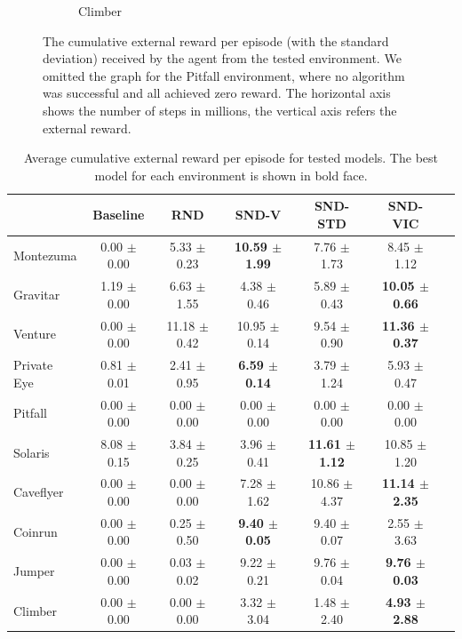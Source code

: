 \documentclass[a4paper,11pt]{elsarticle}
\begin{document}
\begin{figure}[t!]
\begin{subfigure}[b]{0.32\textwidth}
    \caption{Climber}
    \label{fig:res2j}
  \end{subfigure}
\caption{The cumulative external reward per episode (with the standard deviation) received by the agent from the tested environment. We omitted the graph for the Pitfall environment, where no algorithm was successful and all achieved zero reward. The horizontal axis shows the number of steps in millions, the vertical axis refers the external reward.}
\label{fig:result}
\end{figure}

\begin{table}[thb]
\scriptsize
\centering
\caption{Average cumulative external reward per episode for tested models. The best model for each environment is shown in bold face.}
\begin{tabular}{l|cccccc}
\hline
 & Baseline & RND & SND-V & SND-STD & SND-VIC \\
\hline\hline
Montezuma & 0.00 $\pm$ 0.00 & 5.33 $\pm$ 0.23 & \textbf{10.59 $\pm$ 1.99} & 7.76 $\pm$ 1.73 & 8.45 $\pm$ 1.12 \\
Gravitar & 1.19 $\pm$ 0.00 & 6.63 $\pm$ 1.55 & 4.38 $\pm$ 0.46 & 5.89 $\pm$ 0.43 &\textbf{ 10.05 $\pm$ 0.66} \\
Venture & 0.00 $\pm$ 0.00 & 11.18 $\pm$ 0.42 & 10.95 $\pm$ 0.14 & 9.54 $\pm$ 0.90 & \textbf{11.36 $\pm$ 0.37} \\ 
Private Eye & 0.81 $\pm$ 0.01 & 2.41 $\pm$ 0.95 & \textbf{6.59 $\pm$ 0.14} & 3.79 $\pm$ 1.24 & 5.93 $\pm$ 0.47  \\ 
Pitfall & 0.00 $\pm$ 0.00 & 0.00 $\pm$ 0.00 & 0.00 $\pm$ 0.00 & 0.00 $\pm$ 0.00 & 0.00 $\pm$ 0.00 \\ 
Solaris & 8.08 $\pm$ 0.15 & 3.84 $\pm$ 0.25 & 3.96 $\pm$ 0.41 & \textbf{11.61 $\pm$ 1.12} & 10.85 $\pm$ 1.20  \\
Caveflyer & 0.00 $\pm$ 0.00 & 0.00 $\pm$ 0.00 & 7.28 $\pm$ 1.62 & 10.86 $\pm$ 4.37 & \textbf{11.14 $\pm$ 2.35} \\
Coinrun & 0.00 $\pm$ 0.00 & 0.25 $\pm$ 0.50 & \textbf{9.40 $\pm$ 0.05} & 9.40 $\pm$ 0.07 & 2.55 $\pm$ 3.63  \\
Jumper & 0.00 $\pm$ 0.00 & 0.03 $\pm$ 0.02 & 9.22 $\pm$ 0.21 & 9.76 $\pm$ 0.04 & \textbf{9.76 $\pm$ 0.03}\\
Climber & 0.00 $\pm$ 0.00 & 0.00 $\pm$ 0.00 & 3.32 $\pm$ 3.04 & 1.48 $\pm$ 2.40 & \textbf{4.93 $\pm$ 2.88} \\
\hline
\end{tabular}
\label{tab:res2}
\end{table}
\end{document}
